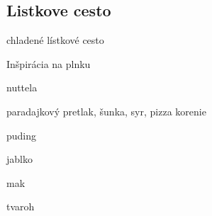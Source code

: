 \setcounter{step}{0}
\subsection{Listkove cesto}

\begin{ingredient}
\begin{main}
	\item chladené lístkové cesto
\end{main}
\begin{subingredient}{Inšpirácia na plnku}
	\item nuttela
	\item paradajkový pretlak, šunka, syr, pizza korenie
	\item puding
	\item jablko
	\item mak
	\item tvaroh
\end{subingredient}
\end{ingredient}%
\begin{recipe}

\end{recipe}

\begin{notes}

\end{notes}	